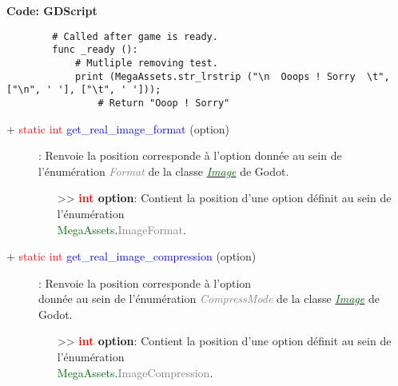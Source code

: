 \documentclass[a4paper, 11pt]{article}
\begin{document}
	\textbf{Code: GDScript}
	\begin{lstlisting}
		# Called after game is ready.
		func _ready ():
			# Mutliple removing test.
			print (MegaAssets.str_lrstrip ("\n  Ooops ! Sorry  \t", ["\n", ' '], ["\t", ' ']));
				# Return "Ooop ! Sorry"
	\end{lstlisting}
	\begin{description}
		\item [+ \textcolor{red}{static int} \textcolor{blue}{get\_real\_image\_format} (option)]: Renvoie
		la position corresponde à l'option donnée au sein de l'énumération \textit{\textcolor{gray}{Format}}
		de la classe 
		\href{https://docs.godotengine.org/en/stable/classes/class_image.html#enum-image-format}
		{\textit{\textcolor{darkgreen}{Image}}} de Godot.
		\begin{itemize}
			\item [>> \textbf{\textcolor{red}{int} option}:] Contient la position d'une option définit au
			sein de l'énumération \\\textcolor{darkgreen}{MegaAssets}.\textcolor{gray}{ImageFormat}.\\
		\end{itemize}
	\end{description}
	\begin{description}
		\item [+ \textcolor{red}{static int} \textcolor{blue}{get\_real\_image\_compression} (option)]: 
		Renvoie	la position corresponde à l'option \\donnée au sein de l'énumération 
		\textit{\textcolor{gray}{CompressMode}} de la classe 
		\href{https://docs.godotengine.org/en/stable/classes/class_image.html#enum-image-compressmode}
		{\textit{\textcolor{darkgreen}{Image}}} de Godot.
		\begin{itemize}
			\item [>> \textbf{\textcolor{red}{int} option}:] Contient la position d'une option définit au
			sein de l'énumération \\\textcolor{darkgreen}{MegaAssets}.\textcolor{gray}{ImageCompression}.\\
		\end{itemize}
	\end{description}
\end{document}
